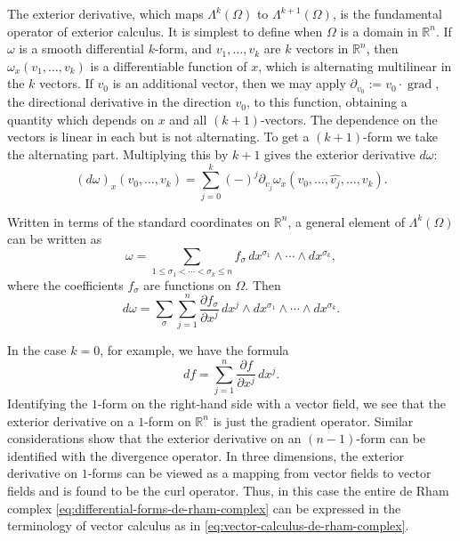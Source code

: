 {The exterior derivative, which maps $\Lambda^k(\Omega)$ to $\Lambda^{k+1}(\Omega)$, is the fundamental operator of exterior calculus. It is simplest to define when $\Omega$ is a domain in $\mathbb R^n$. If $\omega$ is a smooth differential $k$-form, and $v_1,\ldots,v_k$ are $k$ vectors in $\mathbb R^n$, then $\omega_x(v_1,\ldots,v_k)$ is a differentiable function of $x$, which is alternating multilinear in the $k$ vectors. If $v_0$ is an additional vector, then we may apply $\partial_{v_0}:=v_0\cdot\operatorname{grad}$, the directional derivative in the direction $v_0$, to this function, obtaining a quantity which depends on $x$ and all $(k+1)$-vectors. The dependence on the vectors is linear in each but is not alternating. To get a $(k+1)$-form we take the alternating part. Multiplying this by $k+1$ gives the exterior derivative $d\omega$:}
\[
(d\omega)_x(v_0,\ldots,v_k)=\sum_{j=0}^k(-)^j\partial_{v_j}\omega_x(v_0,\ldots,\widehat{v_j},\ldots,v_k).
\]

{Written in terms of the standard coordinates on $\mathbb R^n$, a general element of $\Lambda^k(\Omega)$ can be written as}
\[
\omega=\sum_{1\leq\sigma_1<\cdots<\sigma_k\leq n}f_\sigma\,dx^{\sigma_1}\wedge\cdots\wedge dx^{\sigma_k},
\]
{where the coefficients $f_\sigma$ are functions on $\Omega$. Then}
\begin{equation}\label{eq:exterior-derivative-coordinates}
d\omega=\sum_\sigma\sum_{j=1}^n\frac{\partial f_\sigma}{\partial x^j}\,dx^j\wedge dx^{\sigma_1}\wedge\cdots\wedge dx^{\sigma_k}.
\end{equation}

{In the case $k=0$, for example, we have the formula}
\[
df=\sum_{j=1}^n\frac{\partial f}{\partial x^j}\,dx^j.
\]
{Identifying the $1$-form on the right-hand side with a vector field, we see that the exterior derivative on a $1$-form on $\mathbb R^n$ is just the gradient operator. Similar considerations show that the exterior derivative on an $(n-1)$-form can be identified with the divergence operator. In three dimensions, the exterior derivative on $1$-forms can be viewed as a mapping from vector fields to vector fields and is found to be the curl operator. Thus, in this case the entire de Rham complex \eqref{eq:differential-forms-de-rham-complex} can be expressed in the terminology of vector calculus as in \eqref{eq:vector-calculus-de-rham-complex}.}

